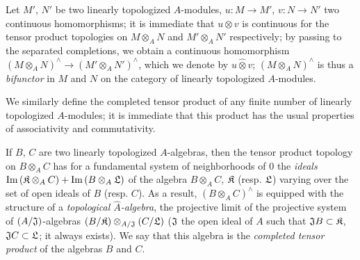 \begin{env}[7.7.3]
\label{0.7.7.3}
Let $M'$, $N'$ be two linearly topologized $A$-modules, $u:M\to M'$, $v:N\to N'$ two continuous
homomorphisms; it is immediate that $u\otimes v$ is continuous for the tensor product topologies on
$M\otimes_A N$ and $M'\otimes_A N'$ respectively; by passing to the separated completions, we obtain
a continuous homomorphism $(M\otimes_A N)^\wedge\to(M'\otimes_A N')^\wedge$, which we denote by
$u\widehat{\otimes}v$; $(M\otimes_A N)^\wedge$ is thus a {\em bifunctor} in $M$ and $N$ on the category
of linearly topologized $A$-modules.
\end{env}

\begin{env}[7.7.4]
\label{0.7.7.4}
We similarly define the completed tensor product of any finite number of linearly topologized
$A$-modules; it is immediate that this product has the usual properties of associativity and
commutativity.
\end{env}

\begin{env}[7.7.5]
\label{0.7.5.5}
If $B$, $C$ are two linearly topologized $A$-algebras, then the tensor product topology on
$B\otimes_A C$ has for a fundamental system of neighborhoods of $0$ the {\em ideals}
${\mathop{\mathrm{Im}}\nolimits}\,(\mathfrak{K}\otimes_A C)+{\mathop{\mathrm{Im}}\nolimits}\,(B\otimes_A\mathfrak{L})$ of the algebra $B\otimes_A C$,
$\mathfrak{K}$ (resp. $\mathfrak{L}$) varying over the set of open ideals of $B$ (resp. $C$).
As a result, $(B\otimes_A C)^\wedge$ is equipped with the structure of a {\em topological
$\widehat{A}$-algebra}, the projective limit of the projective system of $(A/\mathfrak{J})$-algebras
$(B/\mathfrak{K})\otimes_{A/\mathfrak{J}}(C/\mathfrak{L})$ ($\mathfrak{J}$ the open ideal of $A$
such that $\mathfrak{J}B\subset\mathfrak{K}$, $\mathfrak{J}C\subset\mathfrak{L}$; it always exists).
We say that this algebra is the {\em completed tensor product} of the algebras $B$ and $C$.
\end{env}

